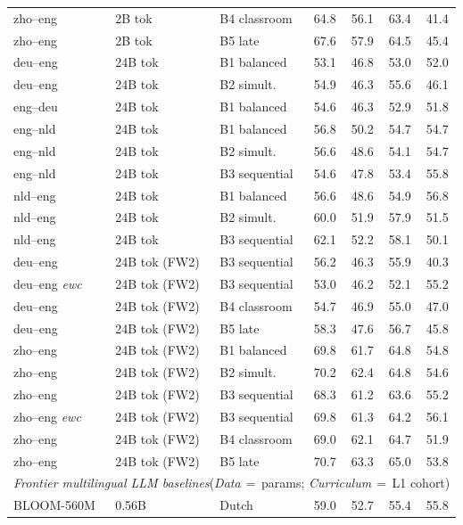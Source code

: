 \begin{table}[t]
\begin{tabular}{lll cccc}
zho--eng & 2B tok & B4 classroom & 64.8 & 56.1 & 63.4 & 41.4 \\
zho--eng & 2B tok & B5 late & 67.6 & 57.9 & 64.5 & 45.4 \\
\midrule
deu--eng & 24B tok & B1 balanced & 53.1 & 46.8 & 53.0 & 52.0 \\
deu--eng & 24B tok & B2 simult. & 54.9 & 46.3 & 55.6 & 46.1 \\
eng--deu & 24B tok & B1 balanced & 54.6 & 46.3 & 52.9 & 51.8 \\
eng--nld & 24B tok & B1 balanced & 56.8 & 50.2 & 54.7 & 54.7 \\
eng--nld & 24B tok & B2 simult. & 56.6 & 48.6 & 54.1 & 54.7 \\
eng--nld & 24B tok & B3 sequential & 54.6 & 47.8 & 53.4 & 55.8 \\
nld--eng & 24B tok & B1 balanced & 56.6 & 48.6 & 54.9 & 56.8 \\
nld--eng & 24B tok & B2 simult. & 60.0 & 51.9 & 57.9 & 51.5 \\
nld--eng & 24B tok & B3 sequential & 62.1 & 52.2 & 58.1 & 50.1 \\
\midrule
deu--eng & 24B tok (FW2) & B3 sequential & 56.2 & 46.3 & 55.9 & 40.3 \\
deu--eng {\scriptsize\textit{ewc}} & 24B tok (FW2) & B3 sequential & 53.0 & 46.2 & 52.1 & 55.2 \\
deu--eng & 24B tok (FW2) & B4 classroom & 54.7 & 46.9 & 55.0 & 47.0 \\
deu--eng & 24B tok (FW2) & B5 late & 58.3 & 47.6 & 56.7 & 45.8 \\
zho--eng & 24B tok (FW2) & B1 balanced & 69.8 & 61.7 & 64.8 & 54.8 \\
zho--eng & 24B tok (FW2) & B2 simult. & 70.2 & 62.4 & 64.8 & 54.6 \\
zho--eng & 24B tok (FW2) & B3 sequential & 68.3 & 61.2 & 63.6 & 55.2 \\
zho--eng {\scriptsize\textit{ewc}} & 24B tok (FW2) & B3 sequential & 69.8 & 61.3 & 64.2 & 56.1 \\
zho--eng & 24B tok (FW2) & B4 classroom & 69.0 & 62.1 & 64.7 & 51.9 \\
zho--eng & 24B tok (FW2) & B5 late & 70.7 & 63.3 & 65.0 & 53.8 \\
\midrule
\midrule
\multicolumn{7}{l}{\textit{Frontier multilingual LLM baselines}\quad(\textit{Data}\,$=$\,params; \textit{Curriculum}\,$=$\,L1 cohort)} \\
\midrule
BLOOM-560M & 0.56B & Dutch & 59.0 & 52.7 & 55.4 & 55.8 \\

\end{tabular}
\end{table}
